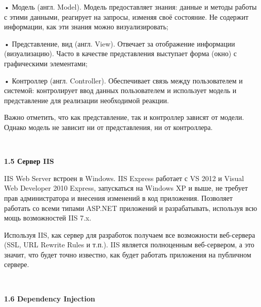 \documentclass[14pt,a4paper]{extreport}
\begin{document}
	• Модель (англ. Model). Модель предоставляет знания: данные и методы работы с этими данными, реагирует на запросы, изменяя своё состояние. Не содержит информации, как эти знания можно визуализировать;\par
	• Представление, вид (англ. View). Отвечает за отображение информации (визуализацию). Часто в качестве представления выступает форма (окно) с графическими элементами;\par
	• Контроллер (англ. Controller). Обеспечивает связь между пользователем и системой: контролирует ввод данных пользователем и использует модель и представление для реализации необходимой реакции.\par
    	Важно отметить, что как представление, так и контроллер зависят от модели. Однако модель не зависит ни от представления, ни от контроллера.\par

	~\\

	\textbf{1.5 Сервер IIS}

	\parindent=1cm IIS Web Server встроен в Windows. IIS Express работает с VS 2012 и Visual Web Developer 2010 Express, запускаться на Windows XP и выше, не требует прав администратора и внесения изменений в код приложения. Позволяет работать со всеми типами ASP.NET приложений и разрабатывать, используя всю мощь возможностей IIS 7.x.\par
	Используя IIS, как сервер для разработок получаем все возможности веб-сервера (SSL, URL Rewrite Rules и т.п.). IIS является полноценным веб-сервером, а это значит, что будет точно известно, как будет работать приложения на публичном сервере.\par

	~\\

	\textbf{1.6 Dependency Injection}
\end{document}
